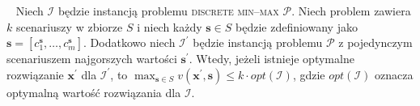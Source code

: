 \begin{theorem}\label{th:minmaxworst}~\cite[$430$]{minmaxSurvey}
	Niech $\mathcal{I}$ będzie instancją problemu \textsc{discrete min--max $\mathcal{P}$}. Niech problem zawiera $k$ scenariuszy w zbiorze $S$ i niech każdy $\textbf{s} \in S$ będzie zdefiniowany jako $\textbf{s} = \left[ c^{\textbf{s}}_{1}, \dots, c^{\textbf{s}}_{m} \right]$. Dodatkowo niech $\mathcal{I^{\prime}}$ będzie instancją problemu $\mathcal{P}$ z pojedynczym scenariuszem najgorszych wartości $\textbf{s}^{\prime}$. Wtedy, jeżeli istnieje optymalne rozwiązanie $\textbf{x}^{\prime}$ dla $\mathcal{I}^{\prime}$, to $\max_{\textbf{s} \in S} v \left( \textbf{x}^{\prime}, \textbf{s} \right) \leqslant k \cdot opt \left( \mathcal{I} \right)$, gdzie $opt \left( \mathcal{I} \right)$ oznacza optymalną wartość rozwiązania dla $\mathcal{I}$.
\end{theorem}

